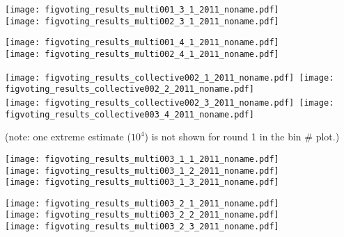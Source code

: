 \begin{frame}[plain]
\begin{frame}[plain]
\begin{frame}[plain]
\begin{frame}[plain]
\begin{frame}[plain]
\begin{frame}[plain]
\begin{frame}[plain]
\begin{frame}[plain]
\begin{frame}[plain]
\begin{frame}[plain]
\begin{frame}[plain]
\begin{frame}[plain]
\begin{frame}[plain]
\begin{frame}[plain]
\begin{frame}[plain]
\begin{frame}[plain]
\begin{frame}[plain]
\begin{frame}[plain]
\begin{frame}[plain]
\begin{frame}[plain]
\begin{frame}[plain]
\begin{frame}[plain]
  \texttt{[image: figvoting\_results\_multi001\_3\_1\_2011\_noname.pdf]}\\
  \texttt{[image: figvoting\_results\_multi002\_3\_1\_2011\_noname.pdf]}


\begin{frame}[plain]
  

  \texttt{[image: figvoting\_results\_multi001\_4\_1\_2011\_noname.pdf]}\\
  \texttt{[image: figvoting\_results\_multi002\_4\_1\_2011\_noname.pdf]}



\begin{frame}[plain]
  

  \texttt{[image: figvoting\_results\_collective002\_1\_2011\_noname.pdf]}~\texttt{[image: figvoting\_results\_collective002\_2\_2011\_noname.pdf]}\\
  \texttt{[image: figvoting\_results\_collective002\_3\_2011\_noname.pdf]}~\texttt{[image: figvoting\_results\_collective003\_4\_2011\_noname.pdf]}

\tiny{(note: one extreme estimate ($10^4$) is not shown for round 1 in the bin \# plot.)}



  

  \texttt{[image: figvoting\_results\_multi003\_1\_1\_2011\_noname.pdf]}\\
  \texttt{[image: figvoting\_results\_multi003\_1\_2\_2011\_noname.pdf]}\\
  \texttt{[image: figvoting\_results\_multi003\_1\_3\_2011\_noname.pdf]}


  

  \texttt{[image: figvoting\_results\_multi003\_2\_1\_2011\_noname.pdf]}\\
  \texttt{[image: figvoting\_results\_multi003\_2\_2\_2011\_noname.pdf]}\\
  \texttt{[image: figvoting\_results\_multi003\_2\_3\_2011\_noname.pdf]}


  


\end{frame}
\end{frame}
\end{frame}
\end{frame}
\end{frame}
\end{frame}
\end{frame}
\end{frame}
\end{frame}
\end{frame}
\end{frame}
\end{frame}
\end{frame}
\end{frame}
\end{frame}
\end{frame}
\end{frame}
\end{frame}
\end{frame}
\end{frame}
\end{frame}
\end{frame}
\end{frame}
\end{frame}
